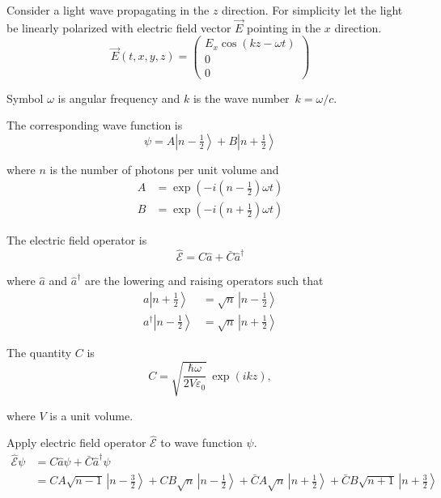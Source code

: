 \documentclass[12pt]{article}
\begin{document}
\noindent
Consider a light wave propagating in the $z$ direction.
For simplicity let the light be linearly polarized with electric
field vector $\vec{E}$ pointing in the $x$ direction.
\begin{equation*}
\vec{E}(t,x,y,z)=\begin{pmatrix}E_x\cos(kz-\omega t)\\0\\0\end{pmatrix}
\end{equation*}

\noindent
Symbol $\omega$ is angular frequency and $k$ is the wave number~$k=\omega/c$.

\bigskip
\noindent
The corresponding wave function is
\begin{equation*}
\psi=A\left|n-\tfrac{1}{2}\right\rangle
+B\left|n+\tfrac{1}{2}\right\rangle
\end{equation*}

\noindent
where $n$ is the number of photons per unit volume and
\begin{align*}
A&=\exp\left(-i\left(n-\tfrac{1}{2}\right)\omega t\right)\\
B&=\exp\left(-i\left(n+\tfrac{1}{2}\right)\omega t\right)
\end{align*}

\noindent
The electric field operator is
\begin{equation*}
\hat{\mathscr{E}}=C\hat{a}+\bar{C}\hat{a}^\dagger
\end{equation*}

\noindent
where $\hat{a}$ and $\hat{a}^\dagger$ are the lowering and raising operators such that
\begin{align*}
a\left|n+\tfrac{1}{2}\right\rangle&=\sqrt{n}\,\left|n-\tfrac{1}{2}\right\rangle\\
a^\dagger\left|n-\tfrac{1}{2}\right\rangle&=\sqrt{n}\,\left|n+\tfrac{1}{2}\right\rangle
\end{align*}

\noindent
The quantity $C$ is
\begin{equation*}
C=\sqrt{\frac{\hbar\omega}{2V\varepsilon_0}}\,\exp(ikz),
\end{equation*}

\noindent
where $V$ is a unit volume.

\bigskip
\noindent
Apply electric field operator $\hat{\mathscr{E}}$ to wave function $\psi$.
\begin{align*}
\hat{\mathscr{E}}\psi
&=C\hat{a}\psi+\bar{C}\hat{a}^\dagger\psi\\
&=CA\sqrt{n-1}\,\left|n-\tfrac{3}{2}\right\rangle+CB\sqrt{n}\,\left|n-\tfrac{1}{2}\right\rangle
+\bar{C}A\sqrt{n}\,\left|n+\tfrac{1}{2}\right\rangle+\bar{C}B\sqrt{n+1}\,\left|n+\tfrac{3}{2}\right\rangle
\end{align*}
\end{document}
